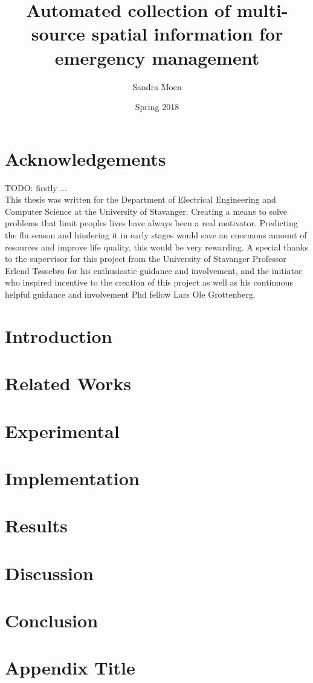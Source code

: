 \documentclass[12pt, twoside]{report}
\title{Automated collection of multi-source spatial information for emergency management}
\author{Sandra Moen}
\date{Spring 2018}
\begin{document}






\chapter*{Acknowledgements}
TODO: firstly ...
\newline \\
This thesis was written for the Department of Electrical Engineering and Computer Science at the University of Stavanger. Creating a means to solve  problems that limit peoples lives have always been a real motivator. Predicting the flu season and hindering it in early stages would save an enormous amount of resources and improve life quality, this would be very rewarding. A special thanks to the supervisor for this project from the University of Stavanger Professor Erlend Tøssebro for his enthusiastic guidance and involvement, and the initiator who inspired incentive to the creation of this project as well as his continuous helpful guidance and involvement Phd fellow Lars Ole Grottenberg.

\setcounter{secnumdepth}{5}
\setcounter{tocdepth}{5}
\tableofcontents
\listoffigures
\listoftables

\chapter{Introduction}


\chapter{Related Works}


\chapter{Experimental}


\chapter{Implementation}


\chapter{Results}


\chapter{Discussion}


\chapter{Conclusion}


\appendix
\chapter{Appendix Title}

\printbibliography
\end{document}
